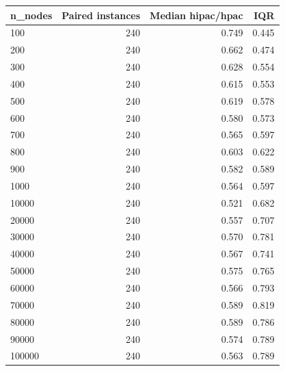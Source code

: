 \begin{tabular}{lrrr}
\toprule
n\_nodes & Paired instances & Median hipac/hpac & IQR \\
\midrule
100 & 240 & 0.749 & 0.445 \\
200 & 240 & 0.662 & 0.474 \\
300 & 240 & 0.628 & 0.554 \\
400 & 240 & 0.615 & 0.553 \\
500 & 240 & 0.619 & 0.578 \\
600 & 240 & 0.580 & 0.573 \\
700 & 240 & 0.565 & 0.597 \\
800 & 240 & 0.603 & 0.622 \\
900 & 240 & 0.582 & 0.589 \\
1000 & 240 & 0.564 & 0.597 \\
10000 & 240 & 0.521 & 0.682 \\
20000 & 240 & 0.557 & 0.707 \\
30000 & 240 & 0.570 & 0.781 \\
40000 & 240 & 0.567 & 0.741 \\
50000 & 240 & 0.575 & 0.765 \\
60000 & 240 & 0.566 & 0.793 \\
70000 & 240 & 0.589 & 0.819 \\
80000 & 240 & 0.589 & 0.786 \\
90000 & 240 & 0.574 & 0.789 \\
100000 & 240 & 0.563 & 0.789 \\
\bottomrule
\end{tabular}
